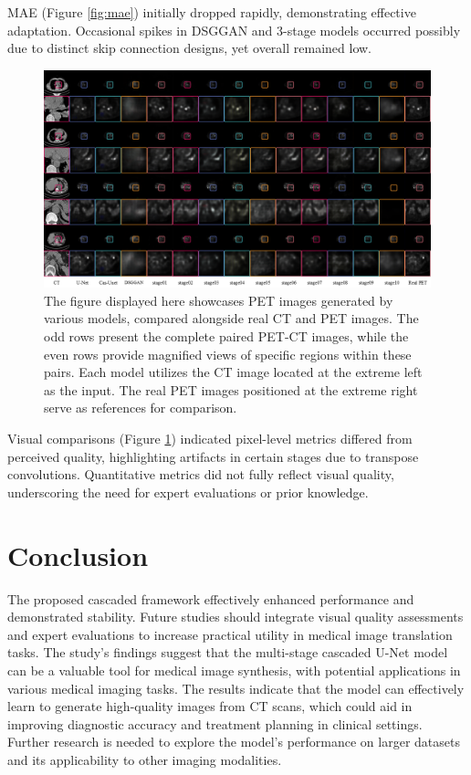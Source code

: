 \documentclass[twocolumn]{article}
\begin{document}
MAE (Figure \ref{fig:mae}) initially dropped rapidly, demonstrating effective adaptation. Occasional spikes in DSGGAN and 3-stage models occurred possibly due to distinct skip connection designs, yet overall remained low.


\begin{figure}[h]
	\centering
	\includegraphics[width=1.0\linewidth]{u-net/lung/lung_compare_folder/lung_compare_13.png}
	\caption[lung_compare]{The figure displayed here showcases PET images generated by various models, compared alongside real CT and PET images. The odd rows present the complete paired PET-CT images, while the even rows provide magnified views of specific regions within these pairs. Each model utilizes the CT image located at the extreme left as the input. The real PET images positioned at the extreme right serve as references for comparison. }
	\label{fig:lung_compare}
\end{figure}
Visual comparisons (Figure \ref{fig:lung_compare}) indicated pixel-level metrics differed from perceived quality, highlighting artifacts in certain stages due to transpose convolutions. Quantitative metrics did not fully reflect visual quality, underscoring the need for expert evaluations or prior knowledge.

\section{Conclusion}
The proposed cascaded framework effectively enhanced performance and demonstrated stability. Future studies should integrate visual quality assessments and expert evaluations to increase practical utility in medical image translation tasks. The study's findings suggest that the multi-stage cascaded U-Net model can be a valuable tool for medical image synthesis, with potential applications in various medical imaging tasks. The results indicate that the model can effectively learn to generate high-quality images from CT scans, which could aid in improving diagnostic accuracy and treatment planning in clinical settings. Further research is needed to explore the model's performance on larger datasets and its applicability to other imaging modalities.
\end{document}
